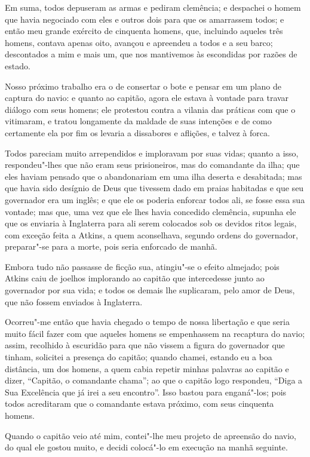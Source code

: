 Em suma, todos depuseram as armas e pediram clemência; e despachei o
homem que havia negociado com eles e outros dois para que os amarrassem
todos; e então meu grande exército de cinquenta homens, que, incluindo
aqueles três homens, contava apenas oito, avançou e apreendeu a todos e
a seu barco; descontados a mim e mais um, que nos mantivemos às
escondidas por razões de estado.

Nosso próximo trabalho era o de consertar o bote e pensar em um plano de
captura do navio: e quanto ao capitão, agora ele estava à vontade para
travar diálogo com seus homens; ele protestou contra a vilania das
práticas com que o vitimaram, e tratou longamente da maldade de suas
intenções e de como certamente ela por fim os levaria a dissabores e
aflições, e talvez à forca.

Todos pareciam muito arrependidos e imploravam por suas vidas; quanto a
isso, respondeu"-lhes que não eram seus prisioneiros, mas do comandante
da ilha; que eles haviam pensado que o abandonariam em uma ilha deserta
e desabitada; mas que havia sido desígnio de Deus que tivessem dado em
praias habitadas e que seu governador era um inglês; e que ele os
poderia enforcar todos ali, se fosse essa sua vontade; mas que, uma vez
que ele lhes havia concedido clemência, supunha ele que os enviaria à
Inglaterra para ali serem colocados sob os devidos ritos legais, com
exceção feita a Atkins, a quem aconselhava, segundo ordens do
governador, preparar"-se para a morte, pois seria enforcado de manhã.

Embora tudo não passasse de ficção sua, atingiu"-se o efeito almejado;
pois Atkins caiu de joelhos implorando ao capitão que intercedesse junto
ao governador por sua vida; e todos os demais lhe suplicaram, pelo amor
de Deus, que não fossem enviados à Inglaterra.

Ocorreu"-me então que havia chegado o tempo de nossa libertação e que
seria muito fácil fazer com que aqueles homens se empenhassem na
recaptura do navio; assim, recolhido à escuridão para que não vissem a
figura do governador que tinham, solicitei a presença do capitão; quando
chamei, estando eu a boa distância, um dos homens, a quem cabia repetir
minhas palavras ao capitão e dizer, ``Capitão, o comandante chama''; ao
que o capitão logo respondeu, ``Diga a Sua Excelência que já irei a seu
encontro''. Isso bastou para enganá"-los; pois todos acreditaram que o
comandante estava próximo, com seus cinquenta homens.

Quando o capitão veio até mim, contei"-lhe meu projeto de apreensão do
navio, do qual ele gostou muito, e decidi colocá"-lo em execução na manhã
seguinte.

